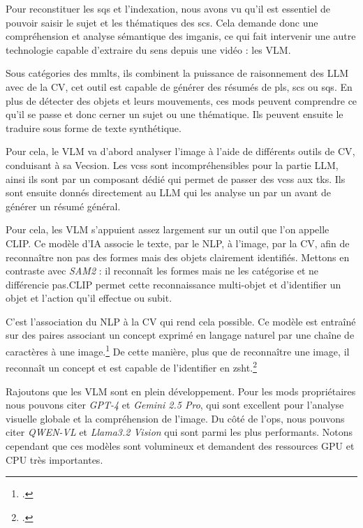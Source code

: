 Pour reconstituer les \glspl{sq} et l'indexation, nous avons vu qu'il est essentiel de pouvoir saisir le sujet et les thématiques des \glspl{sc}. Cela demande donc une compréhension et analyse sémantique des \glspl{imgani}, ce qui fait intervenir une autre technologie capable d'extraire du sens depuis une vidéo : les \gls{VLM}.\newline

Sous catégories des \gls{mmlts}, ils combinent la puissance de raisonnement des \gls{LLM} avec de la \gls{CV}, cet outil est capable de générer des résumés de \glspl{pl}, \glspl{sc} ou \glspl{sq}. En plus de détecter des objets et leurs mouvements, ces \glspl{mod} peuvent comprendre ce qu'il se passe et donc cerner un sujet ou une thématique. Ils peuvent ensuite le traduire sous forme de texte synthétique.

Pour cela, le \gls{VLM} va d'abord analyser l'image à l'aide de différents outils de \gls{CV}, conduisant à sa \gls{Vecsion}. Les \glspl{vcs} sont incompréhensibles pour la partie \gls{LLM}, ainsi ils sont  par un composant dédié qui permet de passer des \glspl{vcs} aux \glspl{tk}. Ils sont ensuite donnés directement au \gls{LLM} qui les analyse un par un avant de générer un résumé général. 

\label{clip} Pour cela, les \gls{VLM} s'appuient assez largement sur un outil que l'on appelle \gls{CLIP}. Ce modèle d'\gls{IA} associe le texte, par le \gls{NLP}, à l'image, par la \gls{CV}, afin de reconnaître non pas des formes mais des objets clairement identifiés. Mettons en contraste avec \textit{SAM2} : il reconnaît les formes mais ne les catégorise et ne différencie pas.\gls{CLIP} permet cette reconnaissance multi-objet et d'identifier un objet et l'action qu'il effectue ou subit. 

C'est l'association du \gls{NLP} à la \gls{CV} qui rend cela possible. Ce modèle est entraîné sur des paires associant un concept exprimé en langage naturel par une chaîne de caractères à une image.\footcite[p.3 à 4]{radfordLearningTransferableVisual2021} De cette manière, plus que de reconnaître une image, il reconnaît un concept et est capable de l'identifier en \gls{zsht}.\footcite[p.6 à 11]{radfordLearningTransferableVisual2021}\newline

Rajoutons que les \gls{VLM} sont en plein développement. Pour les \glspl{mod} propriétaires nous pouvons citer \textit{GPT-4} et \textit{Gemini 2.5 Pro}, qui sont excellent pour l'analyse visuelle globale et la compréhension de l'image. Du côté de l'\gls{ops}, nous pouvons citer \textit{QWEN-VL} et \textit{Llama3.2 Vision} qui sont parmi les plus performants. Notons cependant que ces modèles sont volumineux et demandent des ressources \gls{GPU} et \gls{CPU} très importantes.\newline

